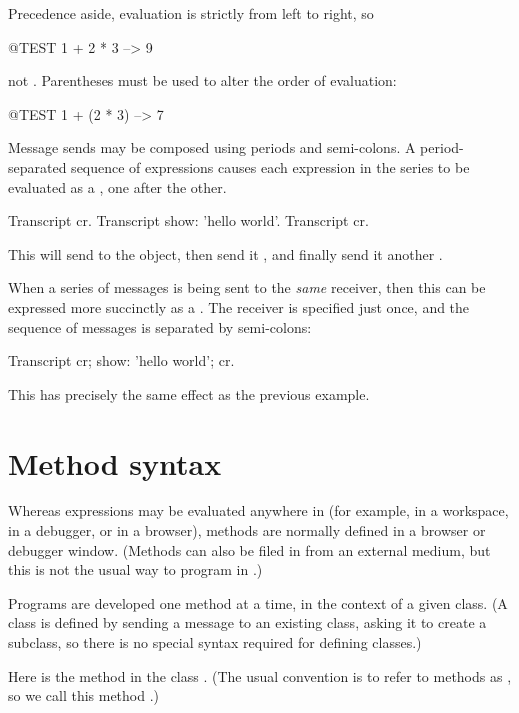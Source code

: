 \documentclass[a4paper,10pt,twoside]{book}
\begin{document}
Precedence aside, evaluation is strictly from left to right, so
\begin{code}{@TEST}
1 + 2 * 3 --> 9
\end{code}
not .
Parentheses must be used to alter the order of evaluation:
\begin{code}{@TEST}
1 + (2 * 3) --> 7
\end{code}

Message sends may be composed using periods and semi-colons.
A period-separated sequence of expressions causes each expression in the series to be evaluated as a , one after the other.

\begin{code}{}
Transcript cr.
Transcript show: 'hello world'.
Transcript cr.
\end{code}

\noindent
This will send  to the  object, then send it , and finally send it another .

When a series of messages is being sent to the \emph{same} receiver, then this can be expressed more succinctly as a .
The receiver is specified just once, and the sequence of messages is separated by semi-colons:

\begin{code}{}
Transcript
	cr;
    show: 'hello world';
    cr.
\end{code}
This has precisely the same effect as the previous example.

\section{Method syntax}

Whereas expressions may be evaluated anywhere in \sq (for example, in a workspace, in a debugger, or in a browser), methods are normally defined in a browser or debugger window.
(Methods can also be filed in from an external medium, but this is not the usual way to program in \sq.)

Programs are developed one method at a time, in the context of a given class.
(A class is defined by sending a message to an existing class, asking it to create a subclass, so there is no special syntax required for defining classes.)

Here is the method  in the class .
(The usual convention is to refer to methods as , so we call this method .)
\end{document}
